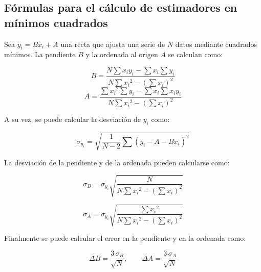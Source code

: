 \subsection{Fórmulas para el cálculo de estimadores en mínimos cuadrados}
\label{sec:apendice:formulas-estimadores-mc}

Sea $y_i = Bx_i + A$ una recta que ajusta una serie de $N$ datos mediante
cuadrados mínimos. La pendiente $B$ y la ordenada al origen $A$ se calculan
como:

\newcommand{\denominador}{N \sum {x_i}^2 - \left( \sum x_i \right)^2} 

\begin{equation}
    \label{ec:apendice:pendiente-mc}
    B = \frac{ N \sum x_i y_i - \sum x_i \sum y_i }
             { \denominador }
\end{equation}
\vspace{5mm}
\begin{equation}
    \label{ec:apendice:ordenada-mc}
    A = \frac{ \sum {x_i}^2 \sum y_i - \sum x_i \sum x_i y_i}
             { \denominador }
\end{equation}
\vspace{5mm}

A su vez, se puede calcular la desviación de $y_i$ como:

\begin{equation}
    \label{ec:apendice:desviacion-y-mc}
    \sigma_{y_i} = \sqrt{ \frac{1}{N-2} \sum 
                          \left( y_i - A - B x_i \right)^2 }
\end{equation}

\vspace{5mm}
La desviación de la pendiente y de la ordenada pueden calcularse como:

\begin{equation}
    \label{ec:apendice:desviacion-pendiente-mc}
    \sigma_B = \sigma_{y_i} \sqrt { \frac{N}{\denominador} }
\end{equation}

\vspace{5mm}
\begin{equation}
    \label{ec:apendice:desviacion-ordenada-mc}
    \sigma_A = \sigma_{y_i} \sqrt { \frac{ \sum {x_i}^2 }{ \denominador } }
\end{equation}

\vspace{5mm}
Finalmente se puede calcular el error en la pendiente y en la ordenada como:

\begin{equation}
    \label{ec:apendice:errores-mc}
    \Delta B = \frac{3\,\sigma_B}{\sqrt{N}}, \quad\quad
    \Delta A = \frac{3\,\sigma_A}{\sqrt{N}}
\end{equation}
